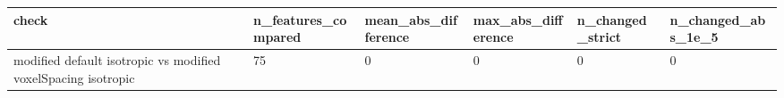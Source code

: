 \begin{tabular}{llllll}
\toprule
check & n\_features\_compared & mean\_abs\_difference & max\_abs\_difference & n\_changed\_strict & n\_changed\_abs\_1e\_5 \\
\midrule
modified default isotropic vs modified voxelSpacing isotropic & 75 & 0 & 0 & 0 & 0 \\
\bottomrule
\end{tabular}

